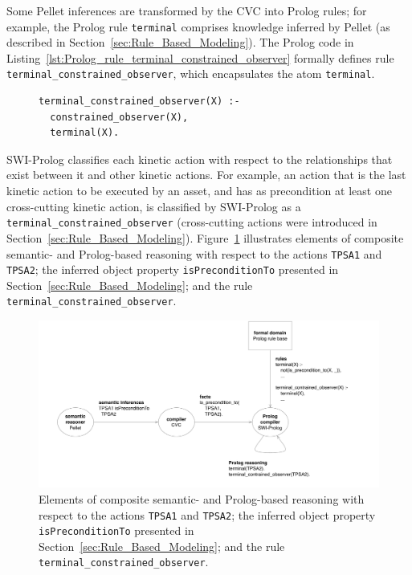 Some Pellet inferences are transformed by the CVC into Prolog rules; for example, the Prolog rule \texttt{terminal} comprises knowledge inferred by Pellet (as described in Section~\ref{sec:Rule_Based_Modeling}). The Prolog code in Listing~\ref{lst:Prolog_rule_terminal_constrained_observer} formally defines rule \texttt{terminal\_constrain\-ed\_observer}, which encapsulates the atom \texttt{terminal}.

\begin{figure}[ht]
\begin{lstlisting}[caption={Prolog code for rule \texttt{terminal\_constrained\_observer}},label=lst:Prolog_rule_terminal_constrained_observer]
terminal_constrained_observer(X) :-
  constrained_observer(X),
  terminal(X).
\end{lstlisting}
\end{figure}

SWI-Prolog classifies each kinetic action with respect to the relationships that exist between it and other kinetic actions. For example, an action that is the last kinetic action to be executed by an asset, and has as precondition at least one cross-cutting kinetic action, is classified by SWI-Prolog as a \texttt{terminal\_constrained\_observer} (cross-cutting actions were introduced in Section~\ref{sec:Rule_Based_Modeling}). Figure~\ref{fig:composite_reasoning} illustrates elements of composite semantic- and Prolog-based reasoning with respect to the actions \texttt{TPSA1} and \texttt{TPSA2}; the inferred object property \texttt{isPreconditionTo} presented in Section~\ref{sec:Rule_Based_Modeling}; and the rule \texttt{terminal\_constrained\_observer}.

\begin{figure}[ht]
\centering
\includegraphics[width=\textwidth]{img/composite-reasoning.pdf}
\caption[Composite reasoning]{Elements of composite semantic- and Prolog-based reasoning with respect to the actions \texttt{TPSA1} and \texttt{TPSA2}; the inferred object property \texttt{isPreconditionTo} presented in Section~\ref{sec:Rule_Based_Modeling}; and the rule \texttt{terminal\_constrained\_observer}.}
\label{fig:composite_reasoning}
\end{figure}

